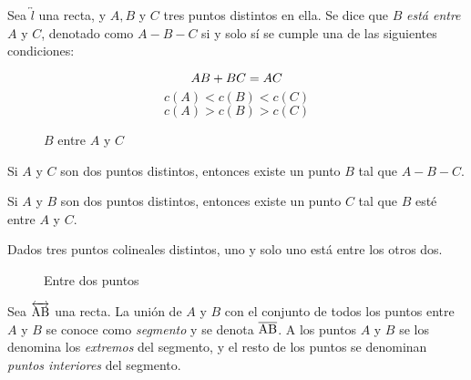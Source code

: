 \begin{definition}
    Sea $\overleftrightarrow{l}$ una recta, y $A, B$ y $C$ tres puntos distintos en ella. Se dice que $B$ \textit{está entre} $A$ y $C$, denotado como $A-B-C$ si y solo sí se cumple una de las siguientes condiciones:

    \begin{equation}
            AB + BC = AC \\
    \end{equation}
    \begin{equation}
        c(A) < c(B) < c(C)
    \end{equation}
    \begin{equation}
        c(A) > c(B) > c(C)
    \end{equation}

    \begin{figure}[!h]
        \centering
        
        \caption{$B$ entre $A$ y $C$}
        \label{fig:plot10}
    \end{figure}
    
\end{definition}

\clearpage

\begin{theorem}
    Si $A$ y $C$ son dos puntos distintos, entonces existe un punto $B$ tal que $A-B-C$.
\end{theorem}

\begin{theorem}
    Si $A$ y $B$ son dos puntos distintos, entonces existe un punto $C$ tal que $B$ esté entre $A$ y $C$.
\end{theorem}

\begin{postulate}
    Dados tres puntos colineales distintos, uno y solo uno está entre los otros dos.
    
    \begin{figure}[!h]
        \centering
        
        \caption{Entre dos puntos}
        \label{fig:plot12}
    \end{figure}
    
\end{postulate}

\begin{definition}
    Sea $\overleftrightarrow{\rm AB}$ una recta. La unión de $A$ y $B$ con el conjunto de todos los puntos entre $A$ y $B$ se conoce como \textit{segmento} y se denota $\overline{\rm AB}$. A los puntos $A$ y $B$ se los denomina los \textit{extremos} del segmento, y el resto de los puntos se denominan \textit{puntos interiores} del segmento. 
\end{definition}


